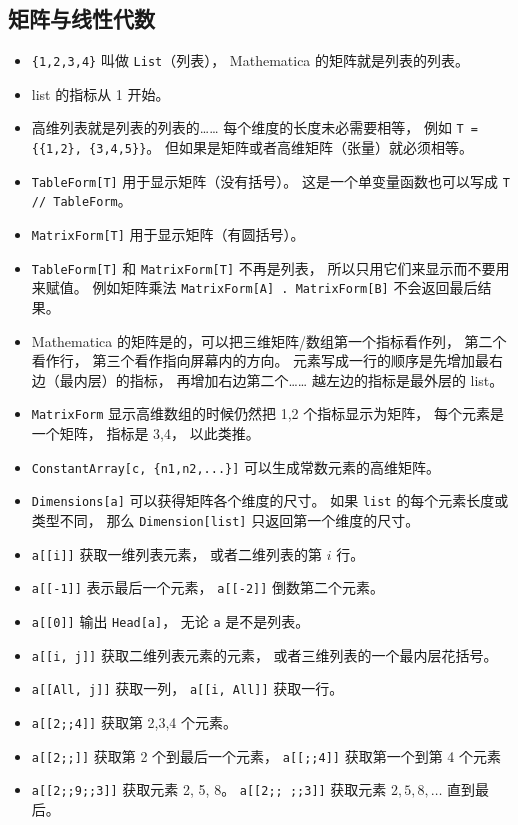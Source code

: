 \subsection{矩阵与线性代数}
\begin{itemize}
\item \verb`{1,2,3,4}` 叫做 \verb`List`（列表）， Mathematica 的矩阵就是列表的列表。
\item list 的指标从 1 开始。
\item 高维列表就是列表的列表的…… 每个维度的长度未必需要相等， 例如 \verb`T = {{1,2}, {3,4,5}}`。 但如果是矩阵或者高维矩阵（张量）就必须相等。
\item \verb`TableForm[T]` 用于显示矩阵（没有括号）。 这是一个单变量函数也可以写成 \verb`T // TableForm`。
\item \verb`MatrixForm[T]` 用于显示矩阵（有圆括号）。
\item \verb`TableForm[T]` 和 \verb`MatrixForm[T]` 不再是列表， 所以只用它们来显示而不要用来赋值。 例如矩阵乘法 \verb`MatrixForm[A] . MatrixForm[B]` 不会返回最后结果。
\item Mathematica 的矩阵是的，可以把三维矩阵/数组第一个指标看作列， 第二个看作行， 第三个看作指向屏幕内的方向。 元素写成一行的顺序是先增加最右边（最内层）的指标， 再增加右边第二个…… 越左边的指标是最外层的 list。
\item \verb`MatrixForm` 显示高维数组的时候仍然把 1,2 个指标显示为矩阵， 每个元素是一个矩阵， 指标是 3,4， 以此类推。
\item \verb`ConstantArray[c, {n1,n2,...}]` 可以生成常数元素的高维矩阵。
\item \verb`Dimensions[a]` 可以获得矩阵各个维度的尺寸。 如果 \verb`list` 的每个元素长度或类型不同， 那么 \verb`Dimension[list]` 只返回第一个维度的尺寸。
\item \verb`a[[i]]` 获取一维列表元素， 或者二维列表的第 $i$ 行。
\item \verb`a[[-1]]` 表示最后一个元素， \verb`a[[-2]]` 倒数第二个元素。
\item \verb`a[[0]]` 输出 \verb`Head[a]`， 无论 \verb`a` 是不是列表。
\item \verb`a[[i, j]]` 获取二维列表元素的元素， 或者三维列表的一个最内层花括号。
\item \verb`a[[All, j]]` 获取一列， \verb`a[[i, All]]` 获取一行。
\item \verb`a[[2;;4]]` 获取第 2,3,4 个元素。
\item \verb`a[[2;;]]` 获取第 2 个到最后一个元素， \verb`a[[;;4]]` 获取第一个到第 4 个元素
\item \verb`a[[2;;9;;3]]` 获取元素 2, 5, 8。 \verb`a[[2;; ;;3]]` 获取元素 $2, 5, 8, \dots$ 直到最后。

\end{itemize}
